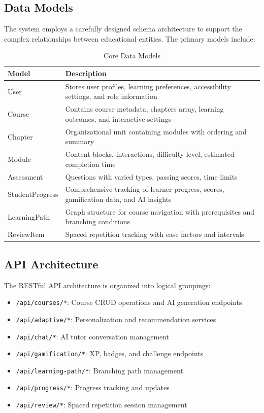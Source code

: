 \documentclass[conference]{IEEEtran}
\begin{document}
\subsection{Data Models}

The system employs a carefully designed schema architecture to support the complex relationships between educational entities. The primary models include:

\begin{table}[htbp]
\caption{Core Data Models}
\begin{center}
\begin{tabular}{|p{2cm}|p{5.5cm}|}
\hline
\textbf{Model} & \textbf{Description} \\
\hline
User & Stores user profiles, learning preferences, accessibility settings, and role information \\
\hline
Course & Contains course metadata, chapters array, learning outcomes, and interactive settings \\
\hline
Chapter & Organizational unit containing modules with ordering and summary \\
\hline
Module & Content blocks, interactions, difficulty level, estimated completion time \\
\hline
Assessment & Questions with varied types, passing scores, time limits \\
\hline
StudentProgress & Comprehensive tracking of learner progress, scores, gamification data, and AI insights \\
\hline
LearningPath & Graph structure for course navigation with prerequisites and branching conditions \\
\hline
ReviewItem & Spaced repetition tracking with ease factors and intervals \\
\hline
\end{tabular}
\label{tab:models}
\end{center}
\end{table}

\subsection{API Architecture}

The RESTful API architecture is organized into logical groupings:

\begin{itemize}
    \item \texttt{/api/courses/*}: Course CRUD operations and AI generation endpoints
    \item \texttt{/api/adaptive/*}: Personalization and recommendation services
    \item \texttt{/api/chat/*}: AI tutor conversation management
    \item \texttt{/api/gamification/*}: XP, badges, and challenge endpoints
    \item \texttt{/api/learning-path/*}: Branching path management
    \item \texttt{/api/progress/*}: Progress tracking and updates
    \item \texttt{/api/review/*}: Spaced repetition session management
\end{itemize}
\end{document}
